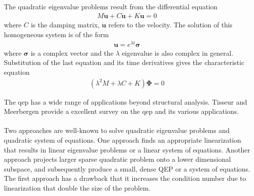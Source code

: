 \paragraph*{}
The quadratic eigenvalue problems result from the differential equation
\begin{align}
    M \ddot{\mathbf{u}} + C \dot{\mathbf{u}} + K\mathbf{u} = 0
\end{align}
where $C$ is the damping matrix, $\dot{\mathbf{u}}$ refers to the velocity. The solution of this homogeneous system is of the form 
\begin{align}
    \mathbf{u} = e^{\lambda t}\boldsymbol{\sigma}
\end{align}\label{eq:qep}
where $\boldsymbol{\sigma}$ is a complex vector and the $\lambda$ eigenvalue is also complex in general. Substitution of the last equation and its time derivatives gives the characteristic equation
\begin{align}
    ( \lambda^2 M + \lambda C + K)\boldsymbol{\Phi} = 0
\end{align}

The \acrshort{qep} has a wide range of applications beyond structural analysis. Tisseur and Meerbergen \cite{Tisseur2001} provide a excellent survey on the \acrshort{qep} and its various applications.  

\paragraph*{}
Two approaches are well-known to solve quadratic eigenvalue problems and quadratic system of equations. One approach finds an appropriate linearization that results in linear eigenvalue problems or a linear system of equations. Another approach projects larger sparse quadratic problem onto a lower dimensional subspace, and subsequently produce a small, dense QEP or a system of equations. The first approach has a drawback that it increases the condition number due to linearization that double the size of the problem. 

